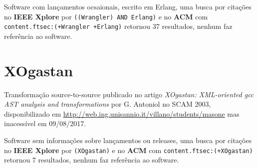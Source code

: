 Software com lançamentos ocsaionais,
escrito em Erlang,
uma busca por citações no {\bf IEEE Xplore} por
\texttt{((Wrangler) AND Erlang)}
e no {\bf ACM} com
\texttt{content.ftsec:(+Wrangler +Erlang)}
retornou
37 resultados,
nenhum faz referência ao software.



\section{XOgastan}

Transformação source-to-source
publicado no artigo {\it XOgastan: XML-oriented gcc AST analysis and transformations}
por G. Antoniol
no SCAM 2003,
disponibilizado em \url{http://web.ing.unisannio.it/villano/students/masone}
mas inacessível em 09/08/2017.

Software sem informações sobre lançamentos ou releases,
uma busca por citações no {\bf IEEE Xplore} por
\texttt{(XOgastan)}
e no {\bf ACM} com
\texttt{content.ftsec:(+XOgastan)}
retornou
7 resultados,
nenhum faz referência ao software.




